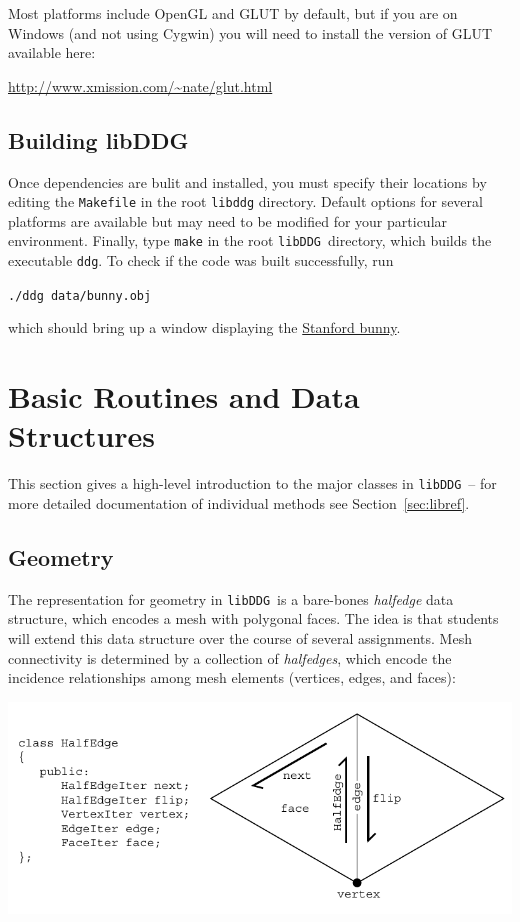 \documentclass{article}
\newcommand{\libddg}{\texttt{libDDG}\ }
\begin{document}
Most platforms include OpenGL and GLUT by default, but if you are on Windows (and not using Cygwin) you will need to install the version of GLUT available here:

\url{http://www.xmission.com/~nate/glut.html}

\subsection{Building libDDG}

Once dependencies are bulit and installed, you must specify their locations by editing the \texttt{Makefile} in the root \texttt{libddg} directory.  Default options for several platforms are available but may need to be modified for your particular environment.  Finally, type \texttt{make} in the root \libddg directory, which builds the executable \texttt{ddg}.  To check if the code was built successfully, run

\texttt{./ddg data/bunny.obj}

which should bring up a window displaying the \href{http://graphics.stanford.edu/software/scanview/models/bunny.html}{Stanford bunny}.

\pagebreak
\section{Basic Routines and Data Structures}

This section gives a high-level introduction to the major classes in \libddg -- for more detailed documentation of individual methods see Section~\ref{sec:libref}.

\subsection{Geometry}

The representation for geometry in \libddg is a bare-bones \emph{halfedge} data structure, which encodes a mesh with polygonal faces.  The idea is that students will extend this data structure over the course of several assignments.  Mesh connectivity is determined by a collection of \emph{halfedges}, which encode the incidence relationships among mesh elements (vertices, edges, and faces):

\vspace{-.3in}
\begin{center}
\includegraphics{illustrations/halfedge.pdf}
\end{center}
\vspace{-.3in}
\end{document}
